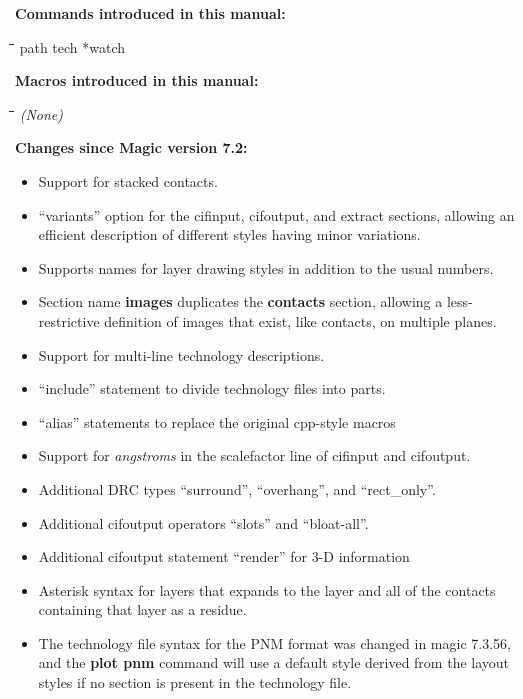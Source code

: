 \documentclass[letterpaper,twoside,12pt]{article}
\def\hinch{\hspace*{0.5in}}
\def\starti{\begin{center}\begin{tabbing}\hinch\=\hinch\=\hinch\=\hinch\=\kill}
\def\endi{\end{tabbing}\end{center}}
\begin{document}
{\noindent\bfseries\large Commands introduced in this manual:}
\starti
   \> path
   \> tech
   \> *watch
\endi

{\noindent\bfseries\large Macros introduced in this manual:}

\starti
   \> {\itshape (None)}
\endi

{\noindent\bfseries\large Changes since Magic version 7.2:}
\begin{itemize}
\item Support for stacked contacts.
\item ``variants'' option for the cifinput, cifoutput, and extract
	sections, allowing an efficient description of different
	styles having minor variations.
\item Supports names for layer drawing styles in addition to the usual
	numbers.
\item Section name {\bfseries images} duplicates the {\bfseries contacts}
	section, allowing a less-restrictive definition of images that
	exist, like contacts, on multiple planes.
\item Support for multi-line technology descriptions.
\item ``include'' statement to divide technology files into parts.
\item ``alias'' statements to replace the original cpp-style macros
\item Support for {\itshape angstroms} in the scalefactor line of
	cifinput and cifoutput.
\item Additional DRC types ``surround'', ``overhang'', and ``rect\_only''.
\item Additional cifoutput operators ``slots'' and ``bloat-all''.
\item Additional cifoutput statement ``render'' for 3-D information
\item Asterisk syntax for layers that expands to the layer and all of
	the contacts containing that layer as a residue.
\item The technology file syntax for the PNM format was changed in
	magic 7.3.56, and the {\bfseries plot pnm} command will
	use a default style derived from the layout styles if no
	section is present in the technology file.
\end{itemize}
\end{document}
